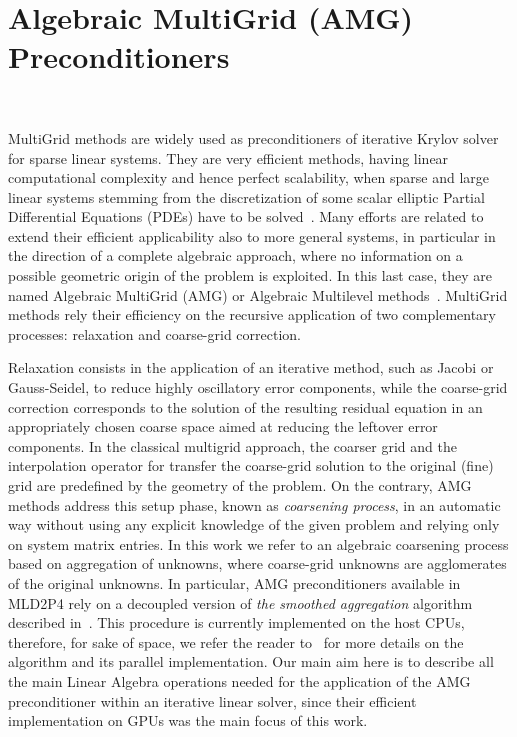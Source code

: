 \section{Algebraic MultiGrid (AMG) Preconditioners}~\label{AMG}
%

MultiGrid methods are widely used as preconditioners of iterative
Krylov solver for sparse linear systems. 
They are very efficient methods, having linear computational
complexity and hence perfect scalability, when 
sparse and large linear systems stemming
from the discretization of some scalar elliptic Partial Differential
Equations (PDEs) have to be solved~\cite{Vassilevski2008}. 
Many efforts are related to extend their efficient applicability also
to more general systems, in particular in the direction of a complete
algebraic approach, where no information on a possible geometric
origin of the problem is exploited. In this last case, they are named
Algebraic MultiGrid (AMG) or Algebraic Multilevel
methods~\cite{Stuben2001}. 
MultiGrid methods rely their efficiency on the recursive application
of two complementary processes: {relaxation and coarse-grid
  correction}. 

Relaxation consists in the application of an iterative method, such as
Jacobi or Gauss-Seidel, to reduce highly oscillatory error components,
while the coarse-grid correction corresponds to the solution of the
resulting residual equation in an appropriately chosen coarse space
aimed at reducing the leftover error components. In the classical
multigrid approach, the coarser grid and the interpolation operator
for transfer the coarse-grid solution to the original (fine) grid are
predefined by the geometry of the problem. On the contrary, AMG
methods address this setup phase, known as \emph{coarsening process},
in an automatic way without using any explicit knowledge of the given
problem and relying only on system matrix entries. In this work we
refer to an algebraic coarsening process based on aggregation of
unknowns, where coarse-grid unknowns are agglomerates of the original
unknowns. In particular, AMG preconditioners available in MLD2P4 rely
on a decoupled version of \emph{the smoothed aggregation} algorithm
described in~\cite{BrezinaVanek96,BrezinaVanek99}. This procedure is
currently implemented on the host CPUs, therefore, for sake of space,
we refer the reader to~\cite{mld2p4-2-guide} for more details on the
algorithm and its parallel implementation. 
Our main aim here is to describe all the main Linear Algebra
operations needed for the application of the AMG preconditioner within
an iterative  linear solver, since their efficient implementation on
GPUs was the main focus of this work. 

